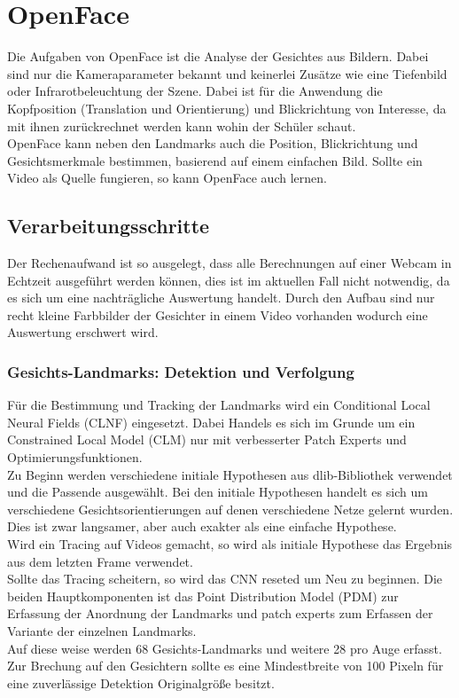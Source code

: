 \section{OpenFace}
Die Aufgaben von OpenFace ist die Analyse der Gesichtes aus Bildern. Dabei sind nur die Kameraparameter bekannt und keinerlei Zusätze wie eine Tiefenbild oder Infrarotbeleuchtung der Szene. Dabei ist für die Anwendung die Kopfposition (Translation und Orientierung) und Blickrichtung von Interesse, da mit ihnen zurückrechnet werden kann wohin der Schüler schaut.\\
OpenFace kann neben den Landmarks auch die Position, Blickrichtung und Gesichtsmerkmale bestimmen, basierend auf einem einfachen Bild. Sollte ein Video als Quelle fungieren, so kann OpenFace auch lernen. 
\subsection{Verarbeitungsschritte}
Der Rechenaufwand ist so ausgelegt, dass alle Berechnungen auf einer Webcam in Echtzeit ausgeführt werden können, dies ist im aktuellen Fall nicht notwendig, da es sich um eine nachträgliche Auswertung handelt. Durch den Aufbau sind nur recht kleine Farbbilder der Gesichter in einem Video vorhanden wodurch eine Auswertung erschwert wird.
\subsubsection{Gesichts-Landmarks: Detektion und Verfolgung}
Für die Bestimmung und Tracking der Landmarks wird ein Conditional Local Neural Fields (CLNF) eingesetzt. Dabei Handels es sich im Grunde um ein Constrained Local Model (CLM) nur mit verbesserter Patch Experts und Optimierungsfunktionen.\\
Zu Beginn werden verschiedene initiale Hypothesen aus dlib-Bibliothek verwendet und die Passende ausgewählt. Bei den initiale Hypothesen handelt es sich um verschiedene Gesichtsorientierungen auf denen verschiedene Netze gelernt wurden. Dies ist zwar langsamer, aber auch exakter als eine einfache Hypothese.\\
Wird ein Tracing auf Videos gemacht, so wird als initiale Hypothese das Ergebnis aus dem letzten Frame verwendet.\\
Sollte das Tracing scheitern, so wird das CNN reseted um Neu zu beginnen.
Die beiden Hauptkomponenten ist das Point Distribution Model (PDM) zur Erfassung der Anordnung der Landmarks und patch experts zum Erfassen der Variante der einzelnen Landmarks.\\
Auf diese weise werden 68 Gesichts-Landmarks und  weitere 28 pro Auge erfasst. Zur Brechung auf den Gesichtern sollte es eine Mindestbreite von 100 Pixeln für eine zuverlässige Detektion Originalgröße besitzt.
